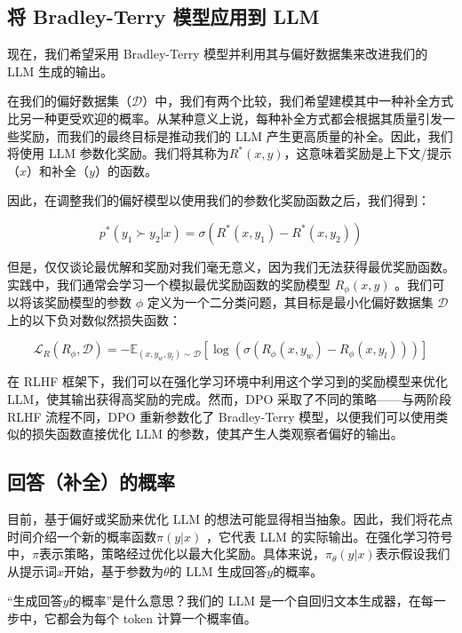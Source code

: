 \documentclass[lang=cn,newtx,10pt,scheme=chinese]{elegantbook}
\begin{document}
\subsection{将 Bradley-Terry 模型应用到 LLM}

现在，我们希望采用 Bradley-Terry 模型并利用其与偏好数据集来改进我们的 LLM 生成的输出。

在我们的偏好数据集（$\mathcal{D}$）中，我们有两个比较，我们希望建模其中一种补全方式比另一种更受欢迎的概率。从某种意义上说，每种补全方式都会根据其质量引发一些奖励，而我们的最终目标是推动我们的 LLM 产生更高质量的补全。因此，我们将使用 LLM 参数化奖励。我们将其称为$R^*(x,y)$，这意味着奖励是上下文/提示（$x$）和补全（$y$）的函数。

因此，在调整我们的偏好模型以使用我们的参数化奖励函数之后，我们得到：

\begin{equation}
p^*(y_1\succ y_2|x)=\sigma(R^*(x,y_1)-R^*(x,y_2))
\end{equation}

但是，仅仅谈论最优解和奖励对我们毫无意义，因为我们无法获得最优奖励函数。实践中，我们通常会学习一个模拟最优奖励函数的奖励模型 $R_\phi(x,y)$ 。我们可以将该奖励模型的参数 $\phi$ 定义为一个二分类问题，其目标是最小化偏好数据集 $\mathcal{D}$ 上的以下负对数似然损失函数：

\begin{equation}
\mathcal{L}_R(R_\phi,\mathcal{D})=-\mathbb{E}_{(x,y_w,y_l)\sim\mathcal{D}}[\log(\sigma(R_\phi(x,y_w)-R_\phi(x,y_l)))]
\end{equation}

在 RLHF 框架下，我们可以在强化学习环境中利用这个学习到的奖励模型来优化 LLM，使其输出获得高奖励的完成。然而，DPO 采取了不同的策略——与两阶段 RLHF 流程不同，DPO 重新参数化了 Bradley-Terry 模型，以便我们可以使用类似的损失函数直接优化 LLM 的参数，使其产生人类观察者偏好的输出。

\subsection{回答（补全）的概率}

目前，基于偏好或奖励来优化 LLM 的想法可能显得相当抽象。因此，我们将花点时间介绍一个新的概率函数$\pi(y|x)$ ，它代表 LLM 的实际输出。在强化学习符号中，$\pi$表示策略，策略经过优化以最大化奖励。具体来说，$\pi_\theta(y|x)$表示假设我们从提示词$x$开始，基于参数为$\theta$的 LLM 生成回答$y$的概率。

``生成回答$y$的概率''是什么意思？我们的 LLM 是一个自回归文本生成器，在每一步中，它都会为每个 token 计算一个概率值。
\end{document}
